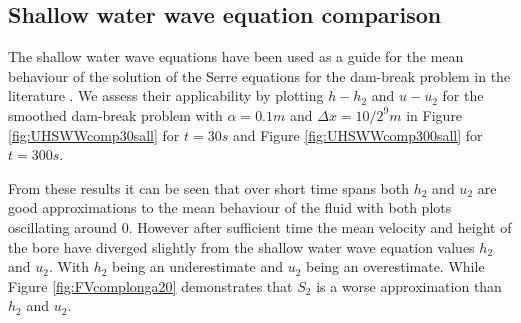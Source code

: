 \documentclass[times]{elsarticle}
\begin{document}
\subsection{Shallow water wave equation comparison}
The shallow water wave equations have been used as a guide for the mean behaviour of the solution of the Serre equations for the dam-break problem in the literature \cite{Hank-etal-2010-2034,Mitsotakis-etal-2014}. We assess their applicability by plotting $h - h_2$ and $u - u_2$ for the smoothed dam-break problem with $\alpha = 0.1m$ and $\Delta x = {10}/{2^9}m$ in Figure \ref{fig:UHSWWcomp30sall} for $t= 30s$ and Figure \ref{fig:UHSWWcomp300sall} for $t= 300s$. 

From these results it can be seen that over short time spans both $h_2$ and $u_2$ are good approximations to the mean behaviour of the fluid with both plots oscillating around $0$. However after sufficient time the mean velocity and height of the bore have diverged slightly from the shallow water wave equation values $h_2$ and $u_2$. With $h_2$ being an underestimate and $u_2$ being an overestimate. While Figure \ref{fig:FVcomplonga20} demonstrates that $S_2$ is a worse approximation than $h_2$ and $u_2$.
\end{document}
